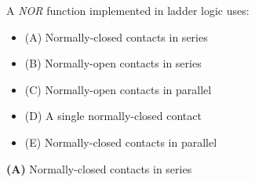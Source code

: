 

A {\it NOR} function implemented in ladder logic uses:

\begin{itemize}
\item{(A)} Normally-closed contacts in series
\vskip 5pt 
\item{(B)} Normally-open contacts in series
\vskip 5pt 
\item{(C)} Normally-open contacts in parallel
\vskip 5pt 
\item{(D)} A single normally-closed contact
\vskip 5pt 
\item{(E)} Normally-closed contacts in parallel
\end{itemize}







{\bf (A)} Normally-closed contacts in series
 










